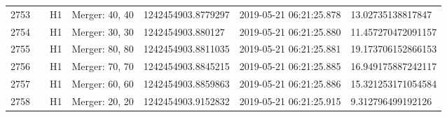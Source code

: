 \begin{longtable}{lllllll}
2753 &                                                    &       H1 &    Merger: 40, 40 &  1242454903.8779297 &  2019-05-21 06:21:25.878 &   13.02735138817847 \\
2754 &                                                    &       H1 &    Merger: 30, 30 &   1242454903.880127 &  2019-05-21 06:21:25.880 &  11.457270472091157 \\
2755 &                                                    &       H1 &    Merger: 80, 80 &  1242454903.8811035 &  2019-05-21 06:21:25.881 &  19.173706152866153 \\
2756 &                                                    &       H1 &    Merger: 70, 70 &  1242454903.8845215 &  2019-05-21 06:21:25.885 &  16.949175887242117 \\
2757 &                                                    &       H1 &    Merger: 60, 60 &  1242454903.8859863 &  2019-05-21 06:21:25.886 &  15.321253171054584 \\
2758 &                                                    &       H1 &    Merger: 20, 20 &  1242454903.9152832 &  2019-05-21 06:21:25.915 &   9.312796499192126 \\
\bottomrule
\end{longtable}
